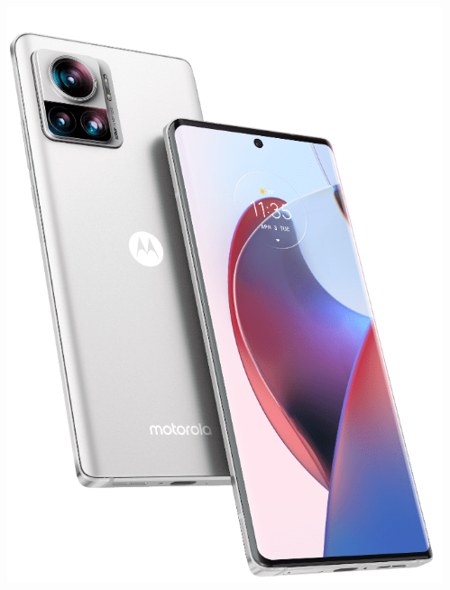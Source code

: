 \begin{frame}
\begin{columns}
\begin{center}
\end{center}
\begin{center}
\includegraphics[width=0.95\linewidth]{00_IntroProgramacionYMoviles/Smartphone_Motorola.png} 
\end{center}
\end{columns}
\end{frame}


